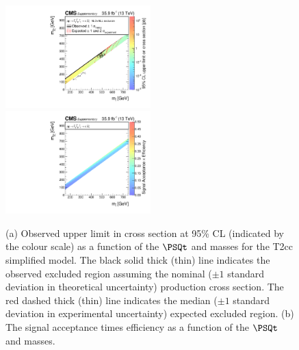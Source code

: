 \begin{figure}
    \begin{center}
            \includegraphics[width=0.50\textwidth]{Supplementary/T2ccXSEC}
            \includegraphics[width=0.50\textwidth]{Supplementary/T2cc_efficiency_aux}
        \caption{ (a) Observed upper limit in cross section at 95\% CL (indicated
        by the colour scale) as a function of 
        the $\PSQt$ and \PSGczDo %
        masses for the 
        T2cc %
        simplified  model.  The  black  solid thick  (thin)  line indicates  the
        observed  excluded  region  assuming   the  nominal  (${\pm}1$  standard
        deviation in theoretical uncertainty)  production cross section. The red
        dashed  thick  (thin)  line  indicates  the  median  (${\pm}1$  standard
        deviation in experimental uncertainty) expected excluded region.
        (b) The signal acceptance times efficiency as a function of 
        the $\PSQt$ and \PSGczDo %
        masses.
        }
        \label{fig:T2cc}
    \end{center}
\end{figure}

